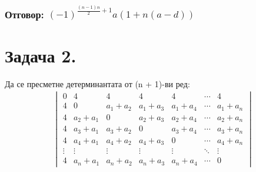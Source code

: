 \documentclass[a4paper, 12pt, oneside]{article}
\begin{document}
\subsubsection*{Отговор: \((-1)^{\displaystyle\frac{(n - 1)n}{2} + 1}a(1 + n(a - d))\)}
\section*{Задача 2.}
Да се пресметне детерминантата от (n + 1)-ви ред:
\begin{align*}
\begin{vmatrix}
    0 & 4 & 4 & 4 & 4 & \cdots & 4 \\
    4 & 0 & a_1 + a_2 & a_1 + a_3 & a_1 + a_4 & \cdots & a_1 + a_n \\
    4 & a_2 + a_1 & 0 & a_2 + a_3 & a_2 + a_4 & \cdots & a_2 + a_n \\
    4 & a_3 + a_1 & a_3 + a_2 & 0 & a_3 + a_4 & \cdots & a_3 + a_n \\
    4 & a_4 + a_1 & a_4 + a_2 & a_4 + a_3 & 0 & \cdots & a_4 + a_n \\
    \vdots & \vdots & \vdots & \vdots & \vdots & \ddots & \vdots \\
    4 & a_n + a_1 & a_n + a_2 & a_n + a_3 & a_n + a_4 & \cdots & 0
\end{vmatrix}
\end{align*}
\end{document}
